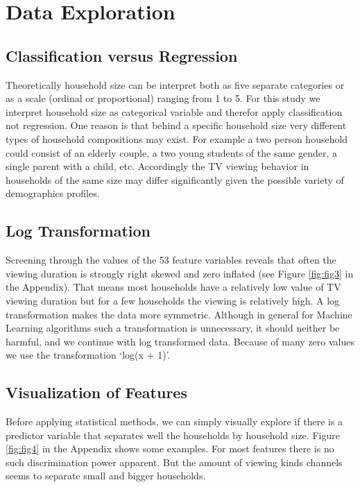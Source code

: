 \documentclass[]{article}
\begin{document}
\hypertarget{data-exploration}{%
\section{Data Exploration}\label{data-exploration}}

\hypertarget{classification-versus-regression}{%
\subsection{Classification versus
Regression}\label{classification-versus-regression}}

Theoretically household size can be interpret both as five separate
categories or as a scale (ordinal or proportional) ranging from 1 to 5.
For this study we interpret household size as categorical variable and
therefor apply classification not regression. One reason is that behind
a specific household size very different types of household compositions
may exist. For example a two person household could consist of an
elderly couple, a two young students of the same gender, a single parent
with a child, etc. Accordingly the TV viewing behavior in households of
the same size may differ significantly given the possible variety of
demographics profiles.

\hypertarget{log-transformation}{%
\subsection{Log Transformation}\label{log-transformation}}

Screening through the values of the 53 feature variables reveals that
often the viewing duration is strongly right skewed and zero inflated
(see Figure \ref{fig:fig3} in the Appendix). That means most households
have a relatively low value of TV viewing duration but for a few
households the viewing is relatively high. A log transformation makes
the data more symmetric. Although in general for Machine Learning
algorithms such a transformation is unnecessary, it should neither be
harmful, and we continue with log transformed data. Because of many zero
values we use the transformation `log(x + 1)'.

\hypertarget{visualization-of-features}{%
\subsection{Visualization of Features}\label{visualization-of-features}}

Before applying statistical methods, we can simply visually explore if
there is a predictor variable that separates well the households by
household size. Figure \ref{fig:fig4} in the Appendix shows some
examples. For most features there is no such discrimination power
apparent. But the amount of viewing kinds channels seems to separate
small and bigger households.
\end{document}
